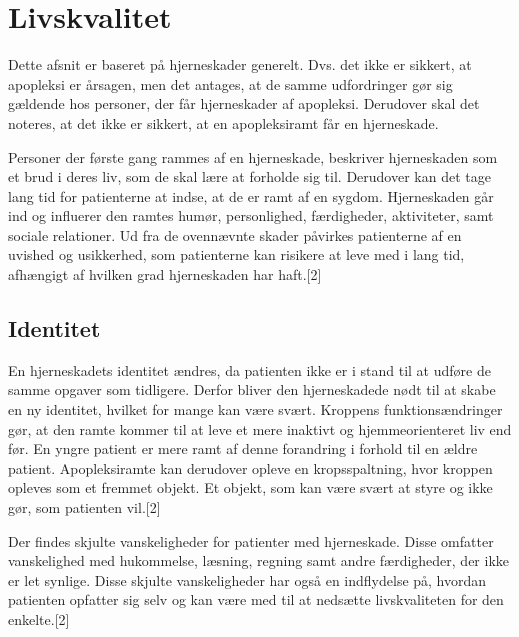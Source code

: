 \section{Livskvalitet}
Dette afsnit er baseret på hjerneskader generelt. Dvs. det ikke er sikkert, at apopleksi er årsagen, men det antages, at de samme udfordringer gør sig gældende hos personer, der får hjerneskader af apopleksi. Derudover skal det noteres, at det ikke er sikkert, at en apopleksiramt får en hjerneskade. 

Personer der første gang rammes af en hjerneskade, beskriver hjerneskaden som et brud i deres liv, som de skal lære at forholde sig til. Derudover kan det tage lang tid for patienterne at indse, at de er ramt af en sygdom. 
Hjerneskaden går ind og influerer den ramtes humør, personlighed, færdigheder, aktiviteter, samt sociale relationer. Ud fra de ovennævnte skader påvirkes patienterne af  en uvished og usikkerhed, som patienterne kan risikere at leve med i lang tid, afhængigt af hvilken grad hjerneskaden har haft.[2] 

\subsection{Identitet}
En hjerneskadets identitet ændres, da patienten ikke er i stand til at udføre de samme opgaver som tidligere. Derfor bliver den hjerneskadede nødt til at skabe en ny identitet, hvilket for mange kan være svært. Kroppens funktionsændringer gør, at den ramte kommer til at leve et mere inaktivt og hjemmeorienteret liv end før. En yngre patient er mere ramt af denne forandring i forhold til en ældre patient. Apopleksiramte kan derudover opleve en kropsspaltning, hvor kroppen opleves som et fremmet objekt. Et objekt, som kan være svært at styre og ikke gør, som patienten vil.[2] 

Der findes skjulte vanskeligheder for patienter med hjerneskade. Disse omfatter vanskelighed med hukommelse, læsning, regning samt andre færdigheder, der ikke er let synlige. Disse skjulte vanskeligheder har også en indflydelse på, hvordan patienten opfatter sig selv og kan være med til at nedsætte livskvaliteten for den enkelte.[2] 

